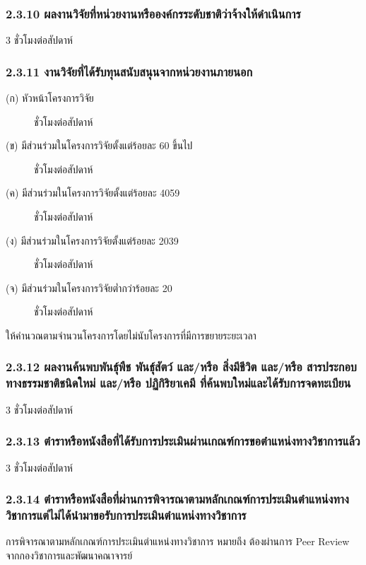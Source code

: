 \documentclass[a4paper,12pt,english]{sphinxmanual}
\begin{document}
\subsubsection{2.3.10 ผลงานวิจัยที่หน่วยงานหรือองค์กรระดับชาติว่าจ้างให้ดำเนินการ}
\label{\detokenize{workload_rubric:id41}}
3 ชั่วโมงต่อสัปดาห์


\subsubsection{2.3.11 งานวิจัยที่ได้รับทุนสนับสนุนจากหน่วยงานภายนอก}
\label{\detokenize{workload_rubric:id42}}\begin{description}
\item[{(ก) หัวหน้าโครงการวิจัย}]  ชั่วโมงต่อสัปดาห์

\item[{(ข) มีส่วนร่วมในโครงการวิจัยตั้งแต่ร้อยละ 60 ขึ้นไป}]  ชั่วโมงต่อสัปดาห์

\item[{(ค) มีส่วนร่วมในโครงการวิจัยตั้งแต่ร้อยละ 40\sphinxhyphen{}59}]  ชั่วโมงต่อสัปดาห์

\item[{(ง) มีส่วนร่วมในโครงการวิจัยตั้งแต่ร้อยละ 20\sphinxhyphen{}39}]  ชั่วโมงต่อสัปดาห์

\item[{(จ) มีส่วนร่วมในโครงการวิจัยต่ำกว่าร้อยละ 20}]  ชั่วโมงต่อสัปดาห์

\end{description}

ให้คำนวณตามจำนวนโครงการโดยไม่นับโครงการที่มีการขยายระยะเวลา


\subsubsection{2.3.12 ผลงานค้นพบพันธุ์พืช พันธุ์สัตว์ และ/หรือ สิ่งมีชีวิต และ/หรือ สารประกอบทางธรรมชาติชนิดใหม่ และ/หรือ ปฏิกิริยาเคมี ที่ค้นพบใหม่และได้รับการจดทะเบียน}
\label{\detokenize{workload_rubric:id43}}
3 ชั่วโมงต่อสัปดาห์


\subsubsection{2.3.13 ตำราหรือหนังสือที่ได้รับการประเมินผ่านเกณฑ์การขอตำแหน่งทางวิชาการแล้ว}
\label{\detokenize{workload_rubric:id44}}
3 ชั่วโมงต่อสัปดาห์


\subsubsection{2.3.14 ตำราหรือหนังสือที่ผ่านการพิจารณาตามหลักเกณฑ์การประเมินตำแหน่งทางวิชาการแต่ไม่ได้นำมาขอรับการประเมินตำแหน่งทางวิชาการ}
\label{\detokenize{workload_rubric:id45}}
การพิจารณาตามหลักเกณฑ์การประเมินตำแหน่งทางวิชาการ หมายถึง ต้องผ่านการ Peer Review จากกองวิชาการและพัฒนาคณาจารย์
\end{document}
